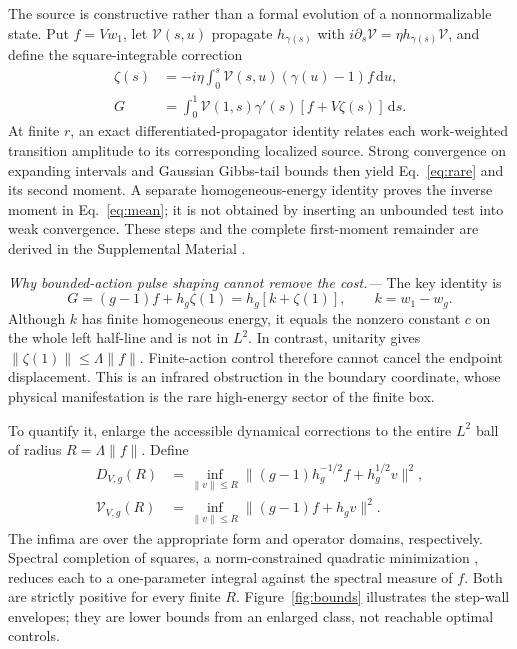 \documentclass[aps,prl,reprint,superscriptaddress,longbibliography]{revtex4-2}
\newcommand{\dd}{\mathrm{d}}
\begin{document}
The source is constructive rather than a formal evolution of a nonnormalizable state. Put $f=Vw_1$, let $\mathcal V(s,u)$ propagate $h_{\gamma(s)}$ with $i\partial_s\mathcal V=\eta h_{\gamma(s)}\mathcal V$, and define the square-integrable correction
\begin{align}
 \zeta(s)&=-i\eta\int_0^s\mathcal V(s,u)(\gamma(u)-1)f\,\dd u,\nonumber\\
 G&=\int_0^1\mathcal V(1,s)\gamma'(s)[f+V\zeta(s)]\,\dd s.
 \label{eq:source}
\end{align}
At finite $r$, an exact differentiated-propagator identity relates each work-weighted transition amplitude to its corresponding localized source. Strong convergence on expanding intervals and Gaussian Gibbs-tail bounds then yield Eq.~\eqref{eq:rare} and its second moment. A separate homogeneous-energy identity proves the inverse moment in Eq.~\eqref{eq:mean}; it is not obtained by inserting an unbounded test into weak convergence. These steps and the complete first-moment remainder are derived in the Supplemental Material \cite{SM}.

\emph{Why bounded-action pulse shaping cannot remove the cost.---}
The key identity is
\begin{equation}
 G=(g-1)f+h_g\zeta(1)=h_g[k+\zeta(1)],\qquad k=w_1-w_g.
 \label{eq:affine}
\end{equation}
Although $k$ has finite homogeneous energy, it equals the nonzero constant $c$ on the whole left half-line and is not in $L^2$. In contrast, unitarity gives $\|\zeta(1)\|\le\Lambda\|f\|$. Finite-action control therefore cannot cancel the endpoint displacement. This is an infrared obstruction in the boundary coordinate, whose physical manifestation is the rare high-energy sector of the finite box.

To quantify it, enlarge the accessible dynamical corrections to the entire $L^2$ ball of radius $R=\Lambda\|f\|$. Define
\begin{align}
 D_{V,g}(R)&=\inf_{\|v\|\le R}\|(g-1)h_g^{-1/2}f+h_g^{1/2}v\|^2,\nonumber\\
 \mathcal V_{V,g}(R)&=\inf_{\|v\|\le R}\|(g-1)f+h_gv\|^2.
 \label{eq:relax}
\end{align}
The infima are over the appropriate form and operator domains, respectively. Spectral completion of squares, a norm-constrained quadratic minimization \cite{MoreSorensen}, reduces each to a one-parameter integral against the spectral measure of $f$. Both are strictly positive for every finite $R$. Figure~\ref{fig:bounds} illustrates the step-wall envelopes; they are lower bounds from an enlarged class, not reachable optimal controls.
\end{document}

